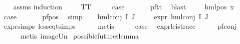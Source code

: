 \begin{isabellebody}
%
\isadelimproof
\ \ %
\endisadelimproof
%
\isatagproof
{}\isamarkupfalse%
\ assms\isanewline
{}\isamarkupfalse%
{\isacharparenleft}{\kern0pt}induction\ {\isasymphi}{\isacharparenright}{\kern0pt}\isanewline
\ \ \isamarkupfalse%
\ TT\isanewline
\ \ \isamarkupfalse%
\ \isamarkupfalse%
\ {\isacharquery}{\kern0pt}case\ \isanewline
\ \ \ \ \isamarkupfalse%
\ pf{\isacharunderscore}{\kern0pt}tt\ \isamarkupfalse%
\ blast\ \isanewline
{}\isamarkupfalse%
\isanewline
\ \ \isamarkupfalse%
\ {\isacharparenleft}{\kern0pt}hml{\isacharunderscore}{\kern0pt}pos\ x{}\ {\isasymphi}{\isacharparenright}{\kern0pt}\isanewline
\ \ \isamarkupfalse%
\ \isamarkupfalse%
\ {\isacharquery}{\kern0pt}case\ \isanewline
\ \ \ \ \isamarkupfalse%
\ pf{\isacharunderscore}{\kern0pt}pos\ \isamarkupfalse%
\ simp\isanewline
{}\isamarkupfalse%
\isanewline
\ \ \isamarkupfalse%
\ {\isacharparenleft}{\kern0pt}hml{\isacharunderscore}{\kern0pt}conj\ I\ J\ {\isasymPhi}{\isacharparenright}{\kern0pt}\isanewline
\ \ \isamarkupfalse%
\ {\isachardoublequoteopen}expr{\isacharunderscore}{\kern0pt}{}\ {\isacharparenleft}{\kern0pt}hml{\isacharunderscore}{\kern0pt}conj\ I\ J\ {\isasymPhi}{\isacharparenright}{\kern0pt}\ {\isasymle}\ {}{\isachardoublequoteclose}\isanewline
\ \ \ \ \isamarkupfalse%
\ expr{\isachardot}{\kern0pt}simps\ less{\isacharunderscore}{\kern0pt}eq{\isacharunderscore}{\kern0pt}t{\isachardot}{\kern0pt}simps\isanewline
\ \ \ \ \isamarkupfalse%
\ metis\isanewline
\ \ \isamarkupfalse%
\ \isamarkupfalse%
\ {\isacharquery}{\kern0pt}case\ \isamarkupfalse%
\ expr{\isacharunderscore}{\kern0pt}{}{\isacharunderscore}{\kern0pt}le{\isacharunderscore}{\kern0pt}{}{\isacharunderscore}{\kern0pt}is{\isacharunderscore}{\kern0pt}trace\isanewline
\ \ \ \ \isamarkupfalse%
\ pf{\isacharunderscore}{\kern0pt}conj\ \isanewline
\ \ \ \ \isamarkupfalse%
\ {\isacharparenleft}{\kern0pt}metis\ image{\isacharunderscore}{\kern0pt}Un{\isacharparenright}{\kern0pt}\isanewline
{}\isamarkupfalse%
%
\endisatagproof
{\isafoldproof}%
%
\isadelimproof
\isanewline
%
\endisadelimproof
\isanewline
{}\isamarkupfalse%
\ possible{\isacharunderscore}{\kern0pt}futures{\isacharunderscore}{\kern0pt}lemma{\isacharcolon}{\kern0pt}\isanewline

\end{isabellebody}
